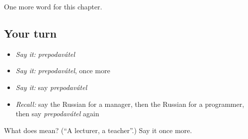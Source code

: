 \begin{grammarlens}[title={What you've built}]
One more word for this chapter.
\end{grammarlens}

\subsection*{Your turn}
\begin{itemize}
\raggedright
  \item \emph{Say it:} \emph{prepodavátel}
  \item \emph{Say it:} \emph{prepodavátel}, once more
  \item \emph{Say it:} say \emph{prepodavátel}
  \item \emph{Recall:} say the Russian for a manager, then the Russian for a programmer, then say \emph{prepodavátel} again
\end{itemize}

\begin{tcolorbox}[breakable,colback=teal!4,colframe=teal!35!black,title={Before you move on}]
What does  mean? (\textquotedblleft{}A lecturer, a teacher\textquotedblright{}.) Say it once more.
\end{tcolorbox}
